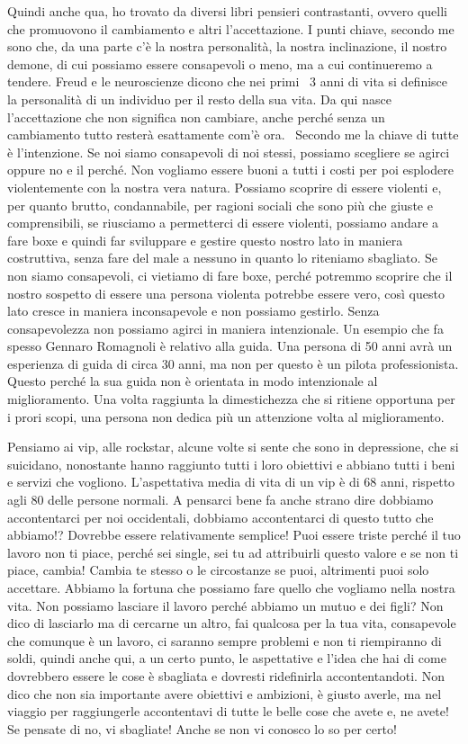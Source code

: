 \documentclass[12pt]{book} %
\begin{document}
Quindi anche qua, ho trovato da diversi libri pensieri contrastanti, ovvero quelli che promuovono il cambiamento e altri
l'accettazione. I punti chiave, secondo me sono che, da una parte c'è la
nostra personalità, la nostra inclinazione, il nostro demone, di cui possiamo essere consapevoli o meno, ma a cui
continueremo a tendere. Freud e le neuroscienze dicono che nei primi \ 3 anni di vita si definisce la personalità di un
individuo per il resto della sua vita. Da qui nasce l'accettazione che non significa non cambiare,
anche perché senza un cambiamento tutto resterà esattamente com'è ora. \ Secondo me la chiave di
tutte è l'intenzione. Se noi siamo consapevoli di noi stessi, possiamo scegliere se agirci oppure
no e il perché. Non vogliamo essere buoni a tutti i costi per poi esplodere violentemente con la nostra vera natura.
Possiamo scoprire di essere violenti e, per quanto brutto, condannabile, per ragioni sociali che sono più che giuste e
comprensibili, se riusciamo a permetterci di essere violenti, possiamo andare a fare boxe e quindi far sviluppare e
gestire questo nostro lato in maniera costruttiva, senza fare del male a nessuno in quanto lo riteniamo sbagliato. Se
non siamo consapevoli, ci vietiamo di fare boxe, perché potremmo scoprire che il nostro sospetto di essere una persona
violenta potrebbe essere vero, così questo lato cresce in maniera inconsapevole e non possiamo gestirlo. Senza
consapevolezza non possiamo agirci in maniera intenzionale. Un esempio che fa spesso Gennaro Romagnoli è relativo alla
guida. Una persona di 50 anni avrà un esperienza di guida di circa 30 anni, ma non per questo è un pilota
professionista. Questo perché la sua guida non è orientata in modo intenzionale al miglioramento. Una volta raggiunta
la dimestichezza che si ritiene opportuna per i prori scopi, una persona non dedica più un attenzione volta al
miglioramento.

Pensiamo ai vip, alle rockstar, alcune volte si sente che sono in depressione, che si suicidano, nonostante hanno
raggiunto tutti i loro obiettivi e abbiano tutti i beni e servizi che vogliono. L'aspettativa media di vita di un vip è
di 68 anni, rispetto agli 80 delle persone normali. A pensarci bene fa anche strano dire dobbiamo accontentarci per noi
occidentali, dobbiamo accontentarci di questo tutto che abbiamo!? Dovrebbe essere relativamente semplice! Puoi essere
triste perché il tuo lavoro non ti piace, perché sei single, sei tu ad attribuirli questo valore e se non ti piace,
cambia! Cambia te stesso o le circostanze se puoi, altrimenti puoi solo accettare. Abbiamo la fortuna che possiamo fare
quello che vogliamo nella nostra vita. Non possiamo lasciare il lavoro perché abbiamo un mutuo e dei figli? Non dico di
lasciarlo ma di cercarne un altro, fai qualcosa per la tua vita, consapevole che comunque è un lavoro, ci saranno
sempre problemi e non ti riempiranno di soldi, quindi anche qui, a un certo punto, le aspettative e
l'idea che hai di come dovrebbero essere le cose è sbagliata e dovresti ridefinirla
accontentandoti. Non dico che non sia importante avere obiettivi e ambizioni, è giusto averle, ma nel viaggio per
raggiungerle accontentavi di tutte le belle cose che avete e, ne avete! Se pensate di no, vi sbagliate! Anche se non vi
conosco lo so per certo! 
\end{document}
